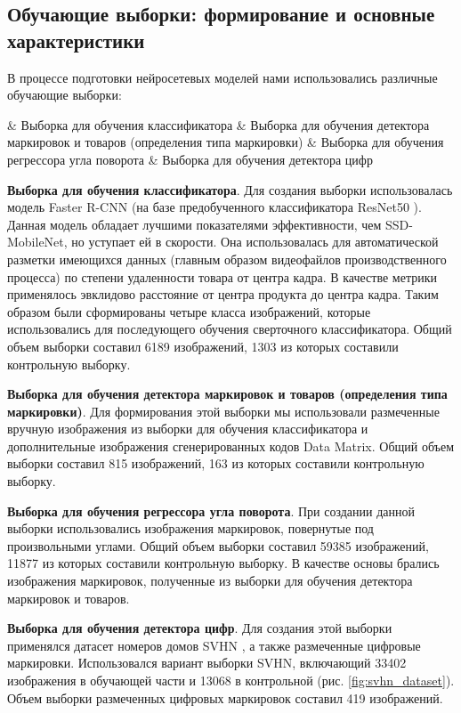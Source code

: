 \subsection{Обучающие выборки: формирование и основные характеристики}

В процессе подготовки нейросетевых моделей нами использовались различные обучающие выборки:

\begin{easylist}
	& Выборка для обучения классификатора
	& Выборка для обучения детектора маркировок и товаров (определения типа маркировки)
	& Выборка для обучения регрессора угла поворота
	& Выборка для обучения детектора цифр
\end{easylist} 

\textbf{Выборка для обучения классификатора}. Для создания выборки использовалась модель Faster R-CNN \cite{ren} (на базе  предобученного классификатора ResNet50 \cite{he}). Данная модель обладает лучшими показателями эффективности, чем SSD-MobileNet, но уступает ей в скорости. Она использовалась для автоматической разметки имеющихся данных (главным образом видеофайлов производственного процесса) по степени удаленности товара от центра кадра. В качестве метрики применялось эвклидово расстояние от центра продукта до центра кадра. Таким образом были сформированы четыре класса изображений, которые использовались для последующего обучения сверточного классификатора. Общий объем выборки составил 6189 изображений, 1303 из которых составили контрольную выборку.

\textbf{Выборка для обучения детектора маркировок и товаров (определения типа маркировки)}. Для формирования этой выборки мы использовали размеченные вручную изображения из выборки для обучения классификатора и дополнительные изображения сгенерированных кодов Data Matrix. Общий объем выборки составил 815 изображений, 163 из которых составили контрольную выборку.

\textbf{Выборка для обучения регрессора угла поворота}. При создании данной выборки использовались изображения маркировок, повернутые под произвольными углами. Общий объем выборки составил 59385 изображений, 11877 из которых составили контрольную выборку. В качестве основы брались изображения маркировок, полученные из выборки для обучения детектора маркировок и товаров.

\textbf{Выборка для обучения детектора цифр}. Для создания этой выборки применялся датасет номеров домов SVHN \cite{netzer}, а также размеченные цифровые маркировки. Использовался вариант выборки SVHN, включающий 33402 изображения в обучающей части и 13068 в контрольной (рис. \ref{fig:svhn_dataset}). Объем выборки размеченных цифровых маркировок составил 419 изображений.

